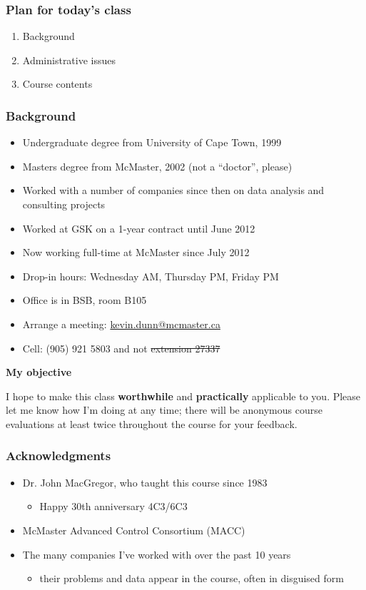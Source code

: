 \begin{frame}\frametitle{Plan for today's class}
	\begin{enumerate}
		\item	Background 
		\item	Administrative issues 
		\item	Course contents 
	\end{enumerate}
\end{frame}

\begin{frame}\frametitle{Background}
	{\color{myGreen}{About myself}}
	\begin{itemize}
		\item	Undergraduate degree from University of Cape Town, 1999
		\item	Masters degree from McMaster, 2002 (not a ``doctor'', please)
		\item	Worked with a number of companies since then on data analysis and consulting projects
		\item	Worked at GSK on a 1-year contract until June 2012
		\item	Now working full-time at McMaster since July 2012
		\item	Drop-in hours: Wednesday AM, Thursday PM, Friday PM
		\item	Office is in BSB, room B105
		\item	Arrange a meeting: \url{kevin.dunn@mcmaster.ca}
		\item	Cell: (905) 921 5803 and not \sout{extension 27337}
	\end{itemize}
	
	\vspace{12pt}
	\textbf{My objective}
	
	\vspace{6pt}
	I hope to make this class \textbf{worthwhile} and \textbf{practically} applicable to you. Please let me know how I'm doing at any time; there will be anonymous course evaluations at least twice throughout the course for your feedback.
\end{frame}

\begin{frame}\frametitle{Acknowledgments}
	\begin{itemize}
		\item	Dr. John MacGregor, who taught this course since 1983
		\begin{itemize}
			\item	Happy 30th anniversary 4C3/6C3
		\end{itemize}
		\item	McMaster Advanced Control Consortium (MACC) 
		\item	The many companies I've worked with over the past 10 years
			\begin{itemize}
				\item	their problems and data appear in the course, often in disguised form
			\end{itemize}
	\end{itemize}
\end{frame}

